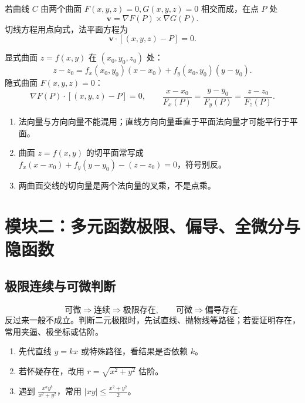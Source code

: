 \documentclass[UTF8,zihao=-4]{ctexart}
\newcommand{\ve}[1]{\bm{#1}}
\newcommand{\grad}{\nabla}
\begin{document}
\begin{methodbox}[空间曲线切线与法平面]
若曲线 $C$ 由两个曲面 $F(x,y,z)=0, G(x,y,z)=0$ 相交而成，在点 $P$ 处
\[
\ve v=\grad F(P)\times \grad G(P).
\]
切线方程用点向式，法平面方程为
\[
\ve v\cdot[(x,y,z)-P]=0.
\]
\end{methodbox}

\begin{methodbox}[曲面切平面与法线]
显式曲面 $z=f(x,y)$ 在 $(x_0,y_0,z_0)$ 处：
\[
z-z_0=f_x(x_0,y_0)(x-x_0)+f_y(x_0,y_0)(y-y_0).
\]
隐式曲面 $F(x,y,z)=0$：
\[
\grad F(P)\cdot[(x,y,z)-P]=0,\qquad \frac{x-x_0}{F_x(P)}=\frac{y-y_0}{F_y(P)}=\frac{z-z_0}{F_z(P)}.
\]
\end{methodbox}

\begin{warnbox}[易错点]
\begin{enumerate}
  \item 法向量与方向向量不能混用；直线方向向量垂直于平面法向量才可能平行于平面。
  \item 曲面 $z=f(x,y)$ 的切平面常写成 $f_x(x-x_0)+f_y(y-y_0)-(z-z_0)=0$，符号别反。
  \item 两曲面交线的切向量是两个法向量的叉乘，不是点乘。
\end{enumerate}
\end{warnbox}

\section{模块二：多元函数极限、偏导、全微分与隐函数}

\subsection{极限连续与可微判断}
\begin{keybox}[判断链]
\[
\text{可微} \Rightarrow \text{连续} \Rightarrow \text{极限存在},\qquad \text{可微} \Rightarrow \text{偏导存在}.
\]
反过来一般不成立。判断二元极限时，先试直线、抛物线等路径；若要证明存在，常用夹逼、极坐标或估阶。
\end{keybox}

\begin{methodbox}[二元极限题模板]
\begin{enumerate}
  \item 先代直线 $y=kx$ 或特殊路径，看结果是否依赖 $k$。
  \item 若怀疑存在，改用 $r=\sqrt{x^2+y^2}$ 估阶。
  \item 遇到 $\frac{x^ay^b}{x^2+y^2}$，常用 $|xy|\leq \frac{x^2+y^2}{2}$。
\end{enumerate}
\end{methodbox}
\end{document}
